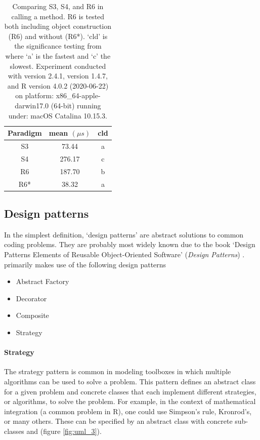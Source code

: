 \begin{table}[h]
\centering
\begin{tabular}{ccc}
\toprule
Paradigm & mean $(\mu s)$ & cld \\
\hline
S3 & 73.44 & a \\
S4 & 276.17 & c \\
R6 & 187.70 & b \\
R6* & 38.32 & a \\
\bottomrule
\end{tabular}
\caption{Comparing S3, S4, and R6 in calling a method. R6 is tested both including object construction (R6) and without (R6*). `cld' is the significance testing from  where `a' is the fastest and `c' the slowest. Experiment conducted with  version 2.4.1,  version 1.4.7, and R version 4.0.2 (2020-06-22) on platform: x86\_64-apple-darwin17.0 (64-bit) running under: macOS Catalina 10.15.3.}
\label{tab:speed}
\end{table}

\subsection{Design patterns}
\label{sec:tools_distr6_patterns_intro}

In the simplest definition, `design patterns' are abstract solutions to common coding problems. They are probably most widely known due to the book `Design Patterns Elements of Reusable Object-Oriented Software' (\textit{Design Patterns}) \citep{Gamma1996}.  primarily makes use of the following design patterns
\begin{itemize}
\item Abstract Factory
\item Decorator
\item Composite
\item Strategy
\end{itemize}

\paragraph{Strategy}
The strategy pattern is common in modeling toolboxes in which multiple algorithms can be used to solve a problem. This pattern defines an abstract class for a given problem and concrete classes that each implement different strategies, or algorithms, to solve the problem. For example, in the context of mathematical integration (a common problem in R), one could use Simpson's rule, Kronrod's, or many others. These can be specified by an  abstract class with concrete sub-classes  and  (figure \ref{fig:uml_3}).

